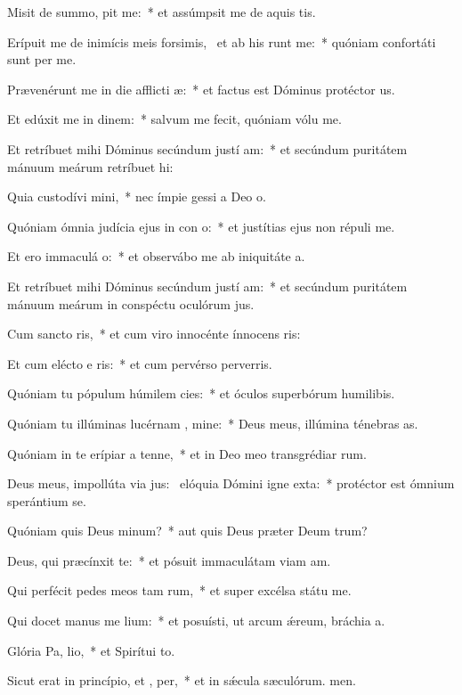 \item Misit de summo,  pit me:~* et assúmpsit me de aquis tis.
\item Erípuit me de inimícis meis forsimis,~\pscross{} et ab his  runt me:~* quóniam confortáti sunt per me.
\item Prævenérunt me in die afflicti æ:~* et factus est Dóminus protéctor us.
\item Et edúxit me in dinem:~* salvum me fecit, quóniam vólu me.
\item Et retríbuet mihi Dóminus secúndum justí am:~* et secúndum puritátem mánuum meárum retríbuet hi:
\item Quia custodívi  mini,~* nec ímpie gessi a Deo o.
\item Quóniam ómnia judícia ejus in con o:~* et justítias ejus non répuli  me.
\item Et ero immaculá  o:~* et observábo me ab iniquitáte a.
\item Et retríbuet mihi Dóminus secúndum justí am:~* et secúndum puritátem mánuum meárum in conspéctu oculórum jus.
\item Cum sancto  ris,~* et cum viro innocénte ínnocens ris:
\item Et cum elécto e ris:~* et cum pervérso perverris.
\item Quóniam tu pópulum húmilem  cies:~* et óculos superbórum humilibis.
\item Quóniam tu illúminas lucérnam , mine:~* Deus meus, illúmina ténebras as.
\item Quóniam in te erípiar a tenne,~* et in Deo meo transgrédiar rum.
\item Deus meus, impollúta via jus:~\pscross{} elóquia Dómini igne exta:~* protéctor est ómnium sperántium  se.
\item Quóniam quis Deus  minum?~* aut quis Deus præter Deum trum?
\item Deus, qui præcínxit  te:~* et pósuit immaculátam viam am.
\item Qui perfécit pedes meos tam rum,~* et super excélsa státu me.
\item Qui docet manus me  lium:~* et posuísti, ut arcum ǽreum, bráchia a.
\item Glória Pa,  lio,~* et Spirítui to.
\item Sicut erat in princípio, et ,  per,~* et in sǽcula sæculórum. men.
